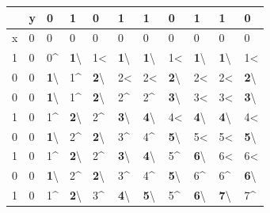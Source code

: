 \documentclass{article}
\begin{document}
\begin{enumerate}
\begin{table}[H]
\begin{tabular}{|l|l|l|l|l|l|l|l|l|l|l|}
\hline
 & y & 0 & 1 & 0 & 1 & 1 & 0 & 1 & 1 & 0 \\ \hline
x & 0 & 0 & 0 & 0 & 0 & 0 & 0 & 0 & 0 & 0 \\ \hline
1 & 0 & 0\textasciicircum{} & \textbf{1}{\textbackslash}{} & 1\textless{} & \textbf{1}{\textbackslash}{} & \textbf{1}{\textbackslash}{} & 1\textless{} & \textbf{1}{\textbackslash}{} & \textbf{1}{\textbackslash}{} & 1\textless{} \\ \hline
0 & 0 & \textbf{1}{\textbackslash}{} & 1\textasciicircum{} & \textbf{2}{\textbackslash}{} & 2\textless{} & 2\textless{} & \textbf{2}{\textbackslash}{} & 2\textless{} & 2\textless{} & \textbf{2}{\textbackslash}{} \\ \hline
0 & 0 & \textbf{1}{\textbackslash}{} & 1\textasciicircum{} & \textbf{2}{\textbackslash}{} & 2\textasciicircum{} & 2\textasciicircum{} & \textbf{3}{\textbackslash}{} & 3\textless{} & 3\textless{} & \textbf{3}{\textbackslash}{} \\ \hline
1 & 0 & 1\textasciicircum{} & \textbf{2}{\textbackslash}{} & 2\textasciicircum{} & \textbf{3}{\textbackslash}{} & \textbf{4}{\textbackslash}{} & 4\textless{} & \textbf{4}{\textbackslash}{} & \textbf{4}{\textbackslash}{} & 4\textless{} \\ \hline
0 & 0 & \textbf{1}{\textbackslash}{} & 2\textasciicircum{} & \textbf{2}{\textbackslash}{} & 3\textasciicircum{} & 4\textasciicircum{} & \textbf{5}{\textbackslash}{} & 5\textless{} & 5\textless{} & \textbf{5}{\textbackslash}{} \\ \hline
1 & 0 & 1\textasciicircum{} & \textbf{2}{\textbackslash}{} & 2\textasciicircum{} & \textbf{3}{\textbackslash}{} & \textbf{4}{\textbackslash}{} & 5\textasciicircum{} & \textbf{6}{\textbackslash}{} & 6\textless{} & 6\textless{} \\ \hline
0 & 0 & \textbf{1}{\textbackslash}{} & 2\textasciicircum{} & \textbf{2}{\textbackslash}{} & 3\textasciicircum{} & 4\textasciicircum{} & \textbf{5}{\textbackslash}{} & 6\textasciicircum{} & 6\textasciicircum{} & \textbf{6}{\textbackslash}{} \\ \hline
1 & 0 & 1\textasciicircum{} & \textbf{2}{\textbackslash}{} & 3\textasciicircum{} & \textbf{4}{\textbackslash}{} & \textbf{5}{\textbackslash}{} & 5\textasciicircum{} & \textbf{6}{\textbackslash}{} & \textbf{7}{\textbackslash}{} & 7\textasciicircum{} \\ \hline


\end{tabular}
\end{table}
\end{enumerate}
\end{document}
